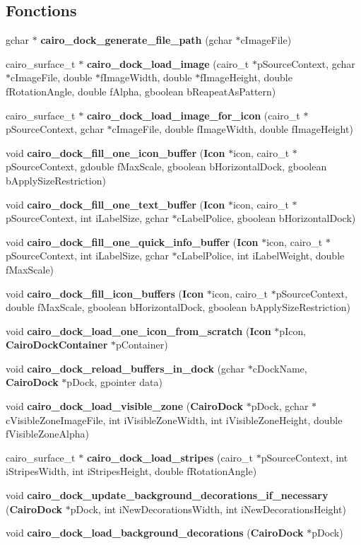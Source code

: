 \subsection*{Fonctions}
\begin{CompactItemize}
\item 
gchar $\ast$ {\bf cairo\_\-dock\_\-generate\_\-file\_\-path} (gchar $\ast$cImageFile)
\item 
cairo\_\-surface\_\-t $\ast$ {\bf cairo\_\-dock\_\-load\_\-image} (cairo\_\-t $\ast$pSourceContext, gchar $\ast$cImageFile, double $\ast$fImageWidth, double $\ast$fImageHeight, double fRotationAngle, double fAlpha, gboolean bReapeatAsPattern)
\item 
cairo\_\-surface\_\-t $\ast$ {\bf cairo\_\-dock\_\-load\_\-image\_\-for\_\-icon} (cairo\_\-t $\ast$pSourceContext, gchar $\ast$cImageFile, double fImageWidth, double fImageHeight)
\item 
void {\bf cairo\_\-dock\_\-fill\_\-one\_\-icon\_\-buffer} ({\bf Icon} $\ast$icon, cairo\_\-t $\ast$pSourceContext, gdouble fMaxScale, gboolean bHorizontalDock, gboolean bApplySizeRestriction)
\item 
void {\bf cairo\_\-dock\_\-fill\_\-one\_\-text\_\-buffer} ({\bf Icon} $\ast$icon, cairo\_\-t $\ast$pSourceContext, int iLabelSize, gchar $\ast$cLabelPolice, gboolean bHorizontalDock)
\item 
void {\bf cairo\_\-dock\_\-fill\_\-one\_\-quick\_\-info\_\-buffer} ({\bf Icon} $\ast$icon, cairo\_\-t $\ast$pSourceContext, int iLabelSize, gchar $\ast$cLabelPolice, int iLabelWeight, double fMaxScale)
\item 
void {\bf cairo\_\-dock\_\-fill\_\-icon\_\-buffers} ({\bf Icon} $\ast$icon, cairo\_\-t $\ast$pSourceContext, double fMaxScale, gboolean bHorizontalDock, gboolean bApplySizeRestriction)
\item 
void {\bf cairo\_\-dock\_\-load\_\-one\_\-icon\_\-from\_\-scratch} ({\bf Icon} $\ast$pIcon, {\bf CairoDockContainer} $\ast$pContainer)
\item 
void {\bf cairo\_\-dock\_\-reload\_\-buffers\_\-in\_\-dock} (gchar $\ast$cDockName, {\bf CairoDock} $\ast$pDock, gpointer data)
\item 
void {\bf cairo\_\-dock\_\-load\_\-visible\_\-zone} ({\bf CairoDock} $\ast$pDock, gchar $\ast$cVisibleZoneImageFile, int iVisibleZoneWidth, int iVisibleZoneHeight, double fVisibleZoneAlpha)
\item 
cairo\_\-surface\_\-t $\ast$ {\bf cairo\_\-dock\_\-load\_\-stripes} (cairo\_\-t $\ast$pSourceContext, int iStripesWidth, int iStripesHeight, double fRotationAngle)
\item 
void {\bf cairo\_\-dock\_\-update\_\-background\_\-decorations\_\-if\_\-necessary} ({\bf CairoDock} $\ast$pDock, int iNewDecorationsWidth, int iNewDecorationsHeight)
\item 
void {\bf cairo\_\-dock\_\-load\_\-background\_\-decorations} ({\bf CairoDock} $\ast$pDock)
\end{CompactItemize}


